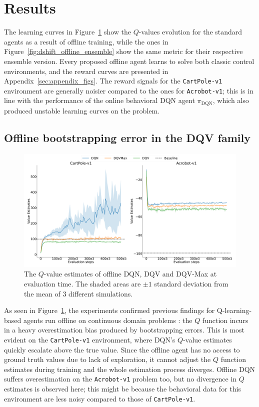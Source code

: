 \section{Results}\label{sec:results}
The learning curves in Figure~\ref{fig:dshift_offline_normal} show the
$Q$-values evolution for the standard agents as a result of offline
training, while the ones in Figure~\ref{fig:dshift_offline_ensemble}
show the same metric for their respective ensemble version. Every
proposed offline agent learns to solve both classic control
environments, and the reward curves are presented in
Appendix~\ref{sec:appendix_figs}.
The reward signals for the \texttt{CartPole-v1} environment are
generally noisier compared to the ones for \texttt{Acrobot-v1}; this
is in line
with the performance of the online behavioral DQN agent
$\pi_{\textrm{DQN}}$, which also produced unstable learning curves on
the problem.

\subsection{Offline bootstrapping error in the DQV family}
\begin{figure}[h]
  \centering
  \includegraphics[width=.5\textwidth]{img/dshift_plots_qv.png}
  \caption{The $Q$-value estimates of offline DQN, DQV and DQV-Max at
    evaluation time. The shaded areas are $\pm 1$ standard deviation
    from the mean of 3 different
    simulations.}\label{fig:dshift_offline_normal}
\end{figure}
As seen in Figure~\ref{fig:dshift_offline_normal}, the experiments
confirmed
previous findings for Q-learning-based agents run offline on continuous
domain problems \citep{pmlr-v97-fujimoto19a,kumar2019stabilizing}: the
$Q$ function incurs in a heavy overestimation bias produced by
bootstrapping errors. This is most evident on the \texttt{CartPole-v1}
environment, where DQN's $Q$-value estimates quickly escalate above
the true value. Since the offline agent has no access to ground truth
values due to lack of exploration, it cannot adjust the $Q$ function
estimates during training and the whole estimation process
diverges. Offline DQN suffers overestimation on the
\texttt{Acrobot-v1} problem too, but no divergence in $Q$ estimates is
observed here; this might be because the behavioral data for this
environment are less noisy compared to those of \texttt{CartPole-v1}.

